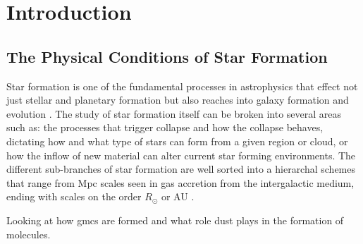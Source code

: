 \chapter{Introduction}\label{intro}

\section{The Physical Conditions of Star Formation}

Star formation is one of the fundamental processes in astrophysics that effect not just stellar and planetary formation but also reaches into galaxy formation and evolution \citep{kennicutt2012}.  The study of star formation itself can be broken into several areas such as: the processes that trigger collapse and how the collapse behaves, dictating how and what type of stars can form from a given region or cloud, or how the inflow of new material can alter current star forming environments.  The different sub-branches of star formation are well sorted into a hierarchal schemes that range from Mpc scales seen in gas accretion from the intergalactic medium, ending with scales on the order $R_\odot$ or AU \citep{kennicutt2012}.  


Looking at how gmcs are formed and what role dust plays in the formation of molecules.





